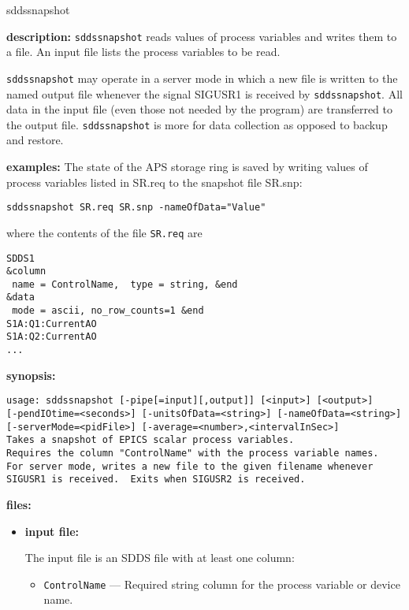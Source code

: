 \begin{sddsprog}{sddssnapshot}
\item \textbf{description:}
\verb+sddssnapshot+ reads values of process variables and writes them to a file.
An input file lists the process variables to be read.

\verb+sddssnapshot+ may operate in a server mode in which a new file is written to the named output file whenever the signal SIGUSR1 is received
by \verb+sddssnapshot+.
All data in the input file (even those not needed by the program) are transferred to the output file.
\verb+sddssnapshot+ is more for data collection as opposed to backup and restore.

\item \textbf{examples:}
The state of the APS storage ring is saved by writing
values of process variables listed in SR.req
to the snapshot file SR.snp:
\begin{verbatim}
sddssnapshot SR.req SR.snp -nameOfData="Value"
\end{verbatim}
where the contents of the file \verb+SR.req+ are
\begin{verbatim}
SDDS1
&column
 name = ControlName,  type = string, &end
&data
 mode = ascii, no_row_counts=1 &end
S1A:Q1:CurrentAO
S1A:Q2:CurrentAO
...
\end{verbatim}

\item \textbf{synopsis:}
\begin{verbatim}
usage: sddssnapshot [-pipe[=input][,output]] [<input>] [<output>]
[-pendIOtime=<seconds>] [-unitsOfData=<string>] [-nameOfData=<string>]
[-serverMode=<pidFile>] [-average=<number>,<intervalInSec>]
Takes a snapshot of EPICS scalar process variables.
Requires the column "ControlName" with the process variable names.
For server mode, writes a new file to the given filename whenever
SIGUSR1 is received.  Exits when SIGUSR2 is received.
\end{verbatim}
\item \textbf{files:}
\begin{itemize}
  \item \textbf{input file:}\par
The input file is an SDDS file with at least one column:
  \begin{itemize}
    \item {\tt ControlName} --- Required string column for the process variable or device name.
  \end{itemize}


\end{itemize}
\end{sddsprog}
